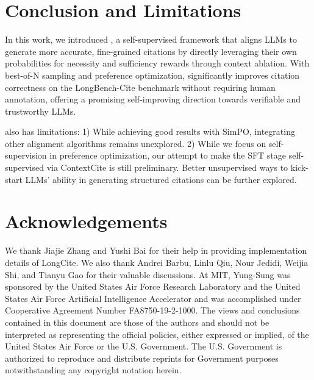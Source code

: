 \section{Conclusion and Limitations}

In this work, we introduced \ours, a self-supervised framework that aligns LLMs to generate more accurate, fine-grained citations by directly leveraging their own probabilities for necessity and sufficiency rewards through context ablation. With best-of-N sampling and preference optimization, \ours significantly improves citation correctness on the LongBench-Cite benchmark without requiring human annotation, offering a promising self-improving direction towards verifiable and trustworthy LLMs.

\ours also has limitations: 1) While achieving good results with SimPO, integrating other alignment algorithms remains unexplored. 2) While we focus on self-supervision in preference optimization, our attempt to make the SFT stage self-supervised via ContextCite is still preliminary. Better unsupervised ways to kick-start LLMs' ability in generating structured citations can be further explored.

\section*{Acknowledgements}

We thank Jiajie Zhang and Yushi Bai for their help in providing implementation details of LongCite. We also thank Andrei Barbu, Linlu Qiu, Nour Jedidi, Weijia Shi, and Tianyu Gao for their valuable discussions. At MIT, Yung-Sung was sponsored by the United States Air Force Research Laboratory and the United States Air Force Artificial Intelligence Accelerator and was accomplished under Cooperative Agreement Number FA8750-19-2-1000. The views and conclusions contained in this document are those of the authors and should not be interpreted as representing the official policies, either expressed or implied, of the United States Air Force or the U.S. Government. The U.S. Government is authorized to reproduce and distribute reprints for Government purposes notwithstanding any copyright notation herein.